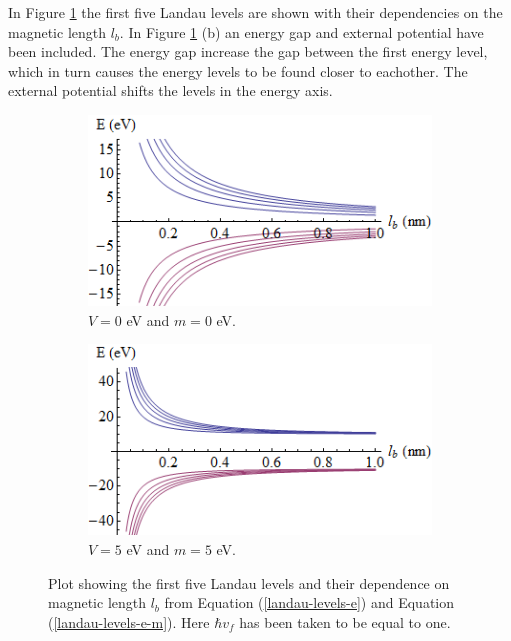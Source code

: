 			In Figure \ref{landau-levels} the first five Landau levels are shown with their dependencies on the magnetic length $l_{b}$. In Figure \ref{landau-levels} (b) an energy gap and external potential have been included. The energy gap increase the gap between the first energy level, which in turn causes the energy levels to be found closer to eachother. The external potential shifts the levels in the energy axis.
			\begin{figure}
				\begin{subfigure}{0.45\textwidth}
					\centerline{\includegraphics[scale=0.6]{images/landau-levels}}
					\caption{$V=0$ eV and $m=0$ eV.}
				\end{subfigure}
				\hspace{1.2cm}
				\begin{subfigure}{0.45\textwidth}
					\centerline{\includegraphics[scale=0.6]{images/landau-levels-v-m}}
					\caption{$V=5$ eV and $m=5$ eV.}
				\end{subfigure}
				\caption{Plot showing the first five Landau levels and their dependence on magnetic length $l_{b}$ from Equation (\ref{landau-levels-e}) and Equation (\ref{landau-levels-e-m}). Here $\hbar v_{f}$ has been taken to be equal to one.}
				\label{landau-levels}
			\end{figure}

